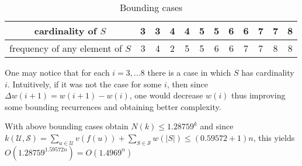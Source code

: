 \begin{table}[ht]
    \centering
    \begin{tabular}{c|c|c|c|c|c|c|c|c|c|c|c}
         cardinality of $S$         & 3 & 3 & 4 & 4 & 5 & 5 & 6 & 6 & 7 & 7 & 8\\
         \hline
         frequency of any element of $S$   & 3 & 4 & 2 & 5 & 5 & 6 & 6 & 7 & 7 & 8 & 8\\
    \end{tabular}
    \caption{Bounding cases}
    \label{bounding_cases}
\end{table}
One may notice that for each $i = 3, \dots 8$ there is a case in which $S$ has cardinality $i$. Intuitively, if it was not the case for some $i$, then since $\Delta w(i+1) = w(i+1) - w(i)$, one would decrease $w(i)$ thus improving some bounding recurrences and obtaining better complexity.
\par With above bounding cases \citeauthor{VANROOIJ20112147} obtain $N(k) \leq 1.28759^k$ and since $k(\mathcal{U}, \mathcal{S}) = \sum_{u \in \mathcal{U}} v(f(u)) + \sum_{S \in \mathcal{S}} w(|S|) \leq (0.59572 + 1) n$, this yields $O(1.28759^{1.59572n}) = O(1.4969^n)$
